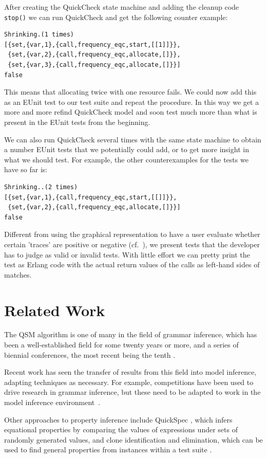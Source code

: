 \documentclass[]{sigplanconf}
\begin{document}
After creating the QuickCheck state machine and adding the cleanup code \verb+stop()+ we can run QuickCheck and get the following counter example:
\begin{verbatim}
Shrinking.(1 times)
[{set,{var,1},{call,frequency_eqc,start,[[1]]}},
 {set,{var,2},{call,frequency_eqc,allocate,[]}},
 {set,{var,3},{call,frequency_eqc,allocate,[]}}]
false
\end{verbatim}
This means that allocating twice with one resource fails. We could now add this as an EUnit test to our test suite and repeat the procedure. In this way we get a more and more refind QuickCheck model and soon test much more than what is present in the EUnit tests from the beginning.

We can also run QuickCheck several times with the same state machine to obtain a number EUnit tests that we potentially could add, or to get more insight in what we should test. For example, the other counterexamples for the tests we have so far is:
\begin{verbatim}
Shrinking..(2 times)
[{set,{var,1},{call,frequency_eqc,start,[[]]}},
 {set,{var,2},{call,frequency_eqc,allocate,[]}}]
false
\end{verbatim}

Different from using the graphical representation to have a user evaluate whether certain 'traces' are positive or negative (cf.\ \cite{arts2010test}), we present tests that the developer has to judge as valid or invalid tests. With little effort we can pretty print the test as Erlang code with the actual return values of  the calls as left-hand sides of matches. 

\section{Related Work}
\label{RelatedWork}

The QSM algorithm is one of many in the field of grammar inference, which has been a well-established field for some twenty years or more, and a series of biennial conferences, the most recent being the tenth \cite{inference}.

Recent work has seen the transfer of results from this field into model inference, adapting techniques as necessary. For example, competitions have been used to drive research in grammar inference, but these need to be adapted to work in the model inference environment~\cite{STAMINA}. 

Other approaches to property inference include QuickSpec \cite{QuickSpec}, which infers equational properties by comparing the values of expressions under sets of randomly generated values, and clone identification and elimination, which can be used to find general properties from instances within a test suite \cite{RefTest2011}.
\end{document}
